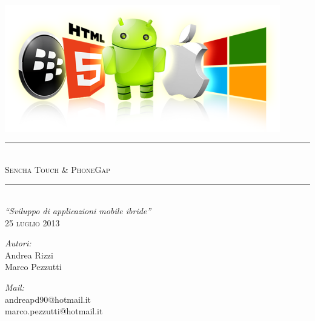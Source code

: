 \documentclass[10pt,a4paper,onecolumn]{article}
\begin{document}
\begin{titlepage}

\begin{center}
 
\textsc{\Large}\\[6cm]

\includegraphics[width=0.9\textwidth]{img/fronte.png}\\[0.3cm]  
\noindent\rule{\textwidth}{0.4pt} \\[0.3cm]
\textsc{\Large Sencha Touch \& PhoneGap}\\[0.1cm]
\noindent\rule{\textwidth}{0.4pt}\\[0.5cm]
\textit{``Sviluppo di applicazioni mobile ibride''} \\[0.5cm]
\textsc{25 luglio 2013}\\[0.5cm]
\begin{minipage}{0.4\textwidth}
\begin{flushleft} \large
\emph{Autori:}\\
Andrea Rizzi\\
Marco Pezzutti
\end{flushleft}
\end{minipage}
\begin{minipage}{0.4\textwidth}
\begin{flushright} \large
\emph{Mail:} \\
andreapd90@hotmail.it\\
marco.pezzutti@hotmail.it
\end{flushright}
\end{minipage}
\end{center}
\end{titlepage}

\clearpage
{}
\tableofcontents
\end{document}
